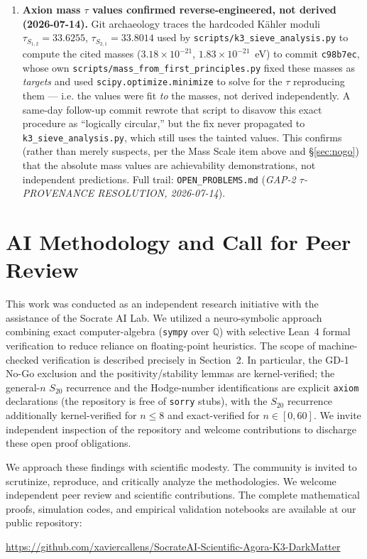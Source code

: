 \documentclass[11pt,a4paper]{article}
\begin{document}
\begin{enumerate}
    \item \textbf{Axion mass $\tau$ values confirmed reverse-engineered, not derived (2026-07-14).} Git archaeology traces the hardcoded Kähler moduli $\tau_{S_{1,2}}=33.6255$, $\tau_{S_{2,1}}=33.8014$ used by \texttt{scripts/k3\_sieve\_analysis.py} to compute the cited masses ($3.18\times10^{-21}$, $1.83\times10^{-21}$~eV) to commit \texttt{c98b7ec}, whose own \texttt{scripts/mass\_from\_first\_principles.py} fixed these masses as \emph{targets} and used \texttt{scipy.optimize.minimize} to solve for the $\tau$ reproducing them — i.e. the values were fit \emph{to} the masses, not derived independently. A same-day follow-up commit rewrote that script to disavow this exact procedure as ``logically circular,'' but the fix never propagated to \texttt{k3\_sieve\_analysis.py}, which still uses the tainted values. This confirms (rather than merely suspects, per the Mass Scale item above and \S\ref{sec:nogo}) that the absolute mass values are achievability demonstrations, not independent predictions. Full trail: \texttt{OPEN\_PROBLEMS.md} (\emph{GAP-2 $\tau$-PROVENANCE RESOLUTION, 2026-07-14}).
\end{enumerate}

\section{AI Methodology and Call for Peer Review}
This work was conducted as an independent research initiative with the assistance of the Socrate AI Lab. We utilized a neuro-symbolic approach combining exact computer-algebra (\texttt{sympy} over $\mathbb{Q}$) with selective Lean~4 formal verification to reduce reliance on floating-point heuristics. The scope of machine-checked verification is described precisely in Section~2. In particular, the GD-1 No-Go exclusion and the positivity/stability lemmas are kernel-verified; the general-$n$ $S_{20}$ recurrence and the Hodge-number identifications are explicit \texttt{axiom} declarations (the repository is free of \texttt{sorry} stubs), with the $S_{20}$ recurrence additionally kernel-verified for $n\le8$ and exact-verified for $n\in[0,60]$. We invite independent inspection of the repository and welcome contributions to discharge these open proof obligations. 

We approach these findings with scientific modesty. The community is invited to scrutinize, reproduce, and critically analyze the methodologies. We welcome independent peer review and scientific contributions. The complete mathematical proofs, simulation codes, and empirical validation notebooks are available at our public repository:
\begin{center}
    \url{https://github.com/xaviercallens/SocrateAI-Scientific-Agora-K3-DarkMatter}
\end{center}
\end{document}
